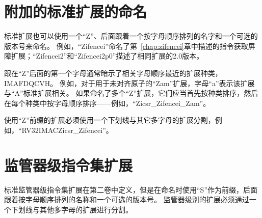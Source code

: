 \section{附加的标准扩展的命名}

标准扩展也可以使用一个“Z”、后面跟着一个按字母顺序排列的名字和一个可选的版本号来命名。
例如，“Zifencei”命名了第~\ref{chap:zifencei}章中描述的指令获取屏障扩展；“Zifencei2”和“Zifencei2p0”描述了相同扩展的2.0版本。

跟在“Z”后面的第一个字母通常暗示了相关字母顺序最近的扩展种类，IMAFDQCVH。
例如，对于用于未对齐原子的“Zam”扩展，字母“a”表示该扩展与“A”标准扩展相关。
如果命名了多个“Z”扩展，它们应当首先按种类排序，然后在每个种类中按字母顺序排序——例如，“Zicsr\_Zifencei\_Zam”。

使用“Z”前缀的扩展必须使用一个下划线与其它多字母的扩展分割，例如，“RV32IMACZicsr\_Zifencei”。

\section{监管器级指令集扩展}

标准监管器级指令集扩展在第二卷中定义，但是在命名时使用“S”作为前缀，后面跟着按字母顺序排列的名称和一个可选的版本号。
监管器级别的扩展必须通过一个下划线与其他多字母的扩展进行分割。

